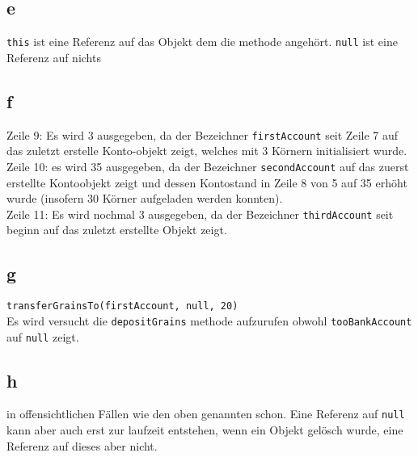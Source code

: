 \documentclass{article}
\begin{document}
\subsection*{e}
\verb|this| ist eine Referenz auf das Objekt dem die methode angehört.
\verb|null| ist eine Referenz auf nichts

\subsection*{f}
Zeile 9: Es wird 3 ausgegeben, da der Bezeichner \verb|firstAccount| seit Zeile 7 auf das 
zuletzt erstelle Konto-objekt zeigt, welches mit 3 Körnern initialisiert wurde.\\
Zeile 10: es wird 35 ausgegeben, da der Bezeichner \verb|secondAccount| auf das zuerst erstellte
Kontoobjekt zeigt und dessen Kontostand in Zeile 8 von 5 auf 35 erhöht wurde (insofern 30 Körner aufgeladen werden konnten).\\
Zeile 11: Es wird nochmal 3 ausgegeben, da der Bezeichner \verb|thirdAccount| seit beginn auf das
zuletzt erstellte Objekt zeigt.

\subsection*{g}
\verb|transferGrainsTo(firstAccount, null, 20)|\\
Es wird versucht die \verb|depositGrains| methode aufzurufen obwohl \verb|tooBankAccount|
auf \verb|null| zeigt.

\subsection*{h}
in offensichtlichen Fällen wie den oben genannten schon. Eine Referenz auf \verb|null| kann aber
auch erst zur laufzeit entstehen, wenn ein Objekt gelösch wurde, eine Referenz auf dieses aber
nicht.
\end{document}
